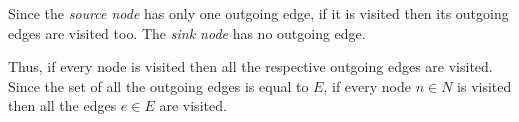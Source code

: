 \documentclass[a4paper,10pt]{article}
\begin{document}
Since the \emph{source node} has only one outgoing edge, if it is visited then its outgoing edges are visited too. The \emph{sink node} has no outgoing edge.

Thus, if every node is visited then all the respective outgoing edges are visited. Since the set of all the outgoing edges is equal to $E$, if every node $n \in N$ is visited then all the edges $e \in E$ are visited.
\end{document}
